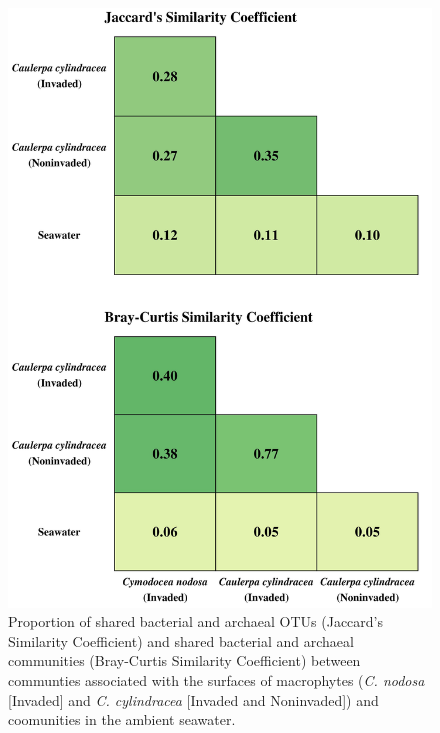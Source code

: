 \documentclass[12pt,]{article}
\begin{document}
\begin{figure}[H]

{\centering \includegraphics[width=0.7\linewidth]{../results/figures/matrix} 

}

\caption{Proportion of shared bacterial and archaeal OTUs (Jaccard's Similarity Coefficient) and shared bacterial and archaeal communities (Bray-Curtis Similarity Coefficient) between communties associated with the surfaces of macrophytes (\textit{C. nodosa} [Invaded] and \textit{C. cylindracea} [Invaded and Noninvaded]) and coomunities in the ambient seawater.\label{matrix}}\label{fig:unnamed-chunk-1}
\end{figure}
\end{document}
